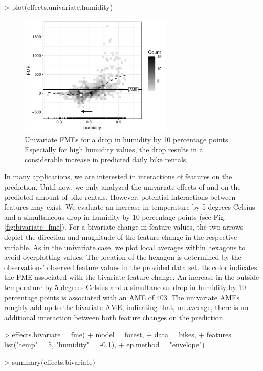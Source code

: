 \begin{example}    
> plot(effects.univariate.humidity)
\end{example}
\begin{figure}[H]
    \centering
    \includegraphics[width = 0.65\textwidth]{figures/univariate_fme_plot_humidity.pdf}
    \caption{Univariate FMEs for a drop in humidity by 10 percentage points. Especially for high humidity values, the drop results in a considerable increase in predicted daily bike rentals.}
    \label{fig:univariate_fme_plot_humidity}
\end{figure}
\noindent In many applications, we are interested in interactions of features on the prediction. 
Until now, we only analyzed the univariate effects of  and  on the predicted amount of bike rentals. However, potential interactions between features may exist. 
We evaluate an increase in temperature by 5 degrees Celsius and a simultaneous drop in humidity by 10 percentage points (see Fig. \ref{fig:bivariate_fme}). For a bivariate change in feature values, the two arrows depict the direction and magnitude of the feature change in the respective variable. As in the univariate case, we plot local averages within hexagons to avoid overplotting values. The location of the hexagon is determined by the observations' observed feature values in the provided data set. Its color indicates the FME associated with the bivariate feature change. An increase in the outside temperature by 5 degrees Celsius and a simultaneous drop in humidity by 10 percentage points is associated with an AME of 403. The univariate AMEs roughly add up to the bivariate AME, indicating that, on average, there is no additional interaction between both feature changes on the prediction.


\begin{example}
> effects.bivariate = fme(
+   model = forest,
+   data = bikes,
+   features = list("temp" = 5, "humidity" = -0.1),
+   ep.method = "envelope")

> summary(effects.bivariate)
\end{example}

